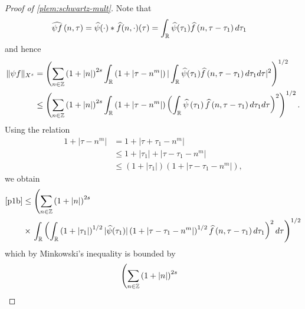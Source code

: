 \begin{proof}[Proof of \cref{plem:schwartz-mult}]
Note that
%
%
\begin{equation*}
	\begin{split}
		\widehat{\psi f}\left( n, \tau \right)
		& = \widehat{\psi}(\cdot) * \widehat{f}(n,
		\cdot)(\tau)
		= \int_{\mathbb{R}} \widehat{\psi}(\tau_1) \widehat{f} \left( n, \tau - \tau_1 \right) 
		d\tau_1
	\end{split}
\end{equation*}
%
%
and hence
%
%
\begin{equation}
	\label{p1b}
	\begin{split}
		\|\psi f\|_{X^s} 
		& = \left( \sum_{n \in \mathbb{Z}} \left (1 + |n| \right )^{2s} \int_{\mathbb{R}} \left( 1 + | \tau -
		n^{m} | \right) | \int_{\mathbb{R}} \widehat{\psi}(\tau_1) \widehat{f}\left( n, \tau -
		\tau_1
		\right)  d \tau_1 d \tau |^2 \right)^{1/2}
		\\
		& \le \left( \sum_{n \in \mathbb{Z}} \left (1 + |n| \right )^{2s} \int_{\mathbb{R}} \left( 1 + | \tau -
		n^{m }
		|
		\right) \left( \int_{\mathbb{R}} \widehat{\psi}\left( \tau_1 \right) \widehat{f}\left( n,
		\tau - \tau_1
		\right)  d \tau_1 d \tau \right)^2 \right)^{1/2}.
	\end{split}
\end{equation}
%
%
Using the relation
%
%
\begin{equation*}
	\begin{split}
		1 + | \tau - n^{m } |
		& = 1 + | \tau + \tau_1 - n^{m} |
		\\
		& \le 1 + | \tau_1 | + | \tau - \tau_1 - n^{m} |
		\\
		& \le \left( 1 + | \tau_1 | \right)\left( 1 + | \tau - \tau_1 -
		n^{m} | \right),
	\end{split}
\end{equation*}
%
%
we obtain
%
%
\begin{equation*}
	\begin{split}
		\eqref{p1b}
		& \le \left( \sum_{n \in \mathbb{Z}} \left (1 + |n| \right )^{2s} \right.
		\\
		& \times \left . \int_{\mathbb{R}} \left(
		\int_{\mathbb{R}} \left( 1 + | \tau_1 | \right)^{1/2} | \widehat{\psi}(\tau_1) |
		\left( 1 + | \tau - \tau_1 - n^{m} | \right)^{1/2} \widehat{f}\left( n, \tau
		- \tau_1
		\right)d \tau_1
		\right)^2 d \tau \right)^{1/2}
	\end{split}
\end{equation*}
%
%
which by Minkowski's inequality is bounded by
%
%
\begin{equation}
	\label{p2b}
	\begin{split}
		& \left( \sum_{n \in \zz} \left (1 + |n| \right )^{2s}  \right.

\end{split}
\end{equation}
\end{proof}
